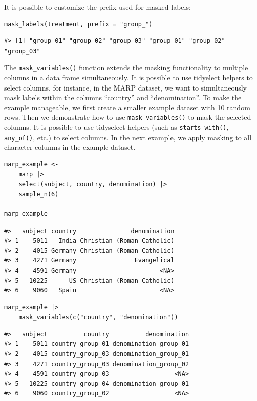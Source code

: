 It is possible to customize the prefix used for masked labels:

\begin{verbatim}
mask_labels(treatment, prefix = "group_")
\end{verbatim}

\begin{verbatim}
#> [1] "group_01" "group_02" "group_03" "group_01" "group_02" "group_03"
\end{verbatim}

The \texttt{mask\_variables()} function extends the masking functionality to multiple columns in a data frame simultaneously. It is possible to use tidyelect helpers to select columns. for instance, in the MARP dataset, we want to simultaneously mask labels within the columns ``country'' and ``denomination''. To make the example manageable, we first create a smaller example dataset with 10 random rows. Then we demonstrate how to use \texttt{mask\_variables()} to mask the selected columns. It is possible to use tidyselect helpers (such as \texttt{starts\_with()}, \texttt{any\_of()}, etc.) to select columns. In the next example, we apply masking to all character columns in the example dataset.

\begin{verbatim}
marp_example <-
    marp |>
    select(subject, country, denomination) |> 
    sample_n(6)

marp_example
\end{verbatim}

\begin{verbatim}
#>   subject country               denomination
#> 1    5011   India Christian (Roman Catholic)
#> 2    4015 Germany Christian (Roman Catholic)
#> 3    4271 Germany                Evangelical
#> 4    4591 Germany                       <NA>
#> 5   10225      US Christian (Roman Catholic)
#> 6    9060   Spain                       <NA>
\end{verbatim}

\begin{verbatim}
marp_example |> 
    mask_variables(c("country", "denomination"))
\end{verbatim}

\begin{verbatim}
#>   subject          country          denomination
#> 1    5011 country_group_01 denomination_group_01
#> 2    4015 country_group_03 denomination_group_01
#> 3    4271 country_group_03 denomination_group_02
#> 4    4591 country_group_03                  <NA>
#> 5   10225 country_group_04 denomination_group_01
#> 6    9060 country_group_02                  <NA>
\end{verbatim}

